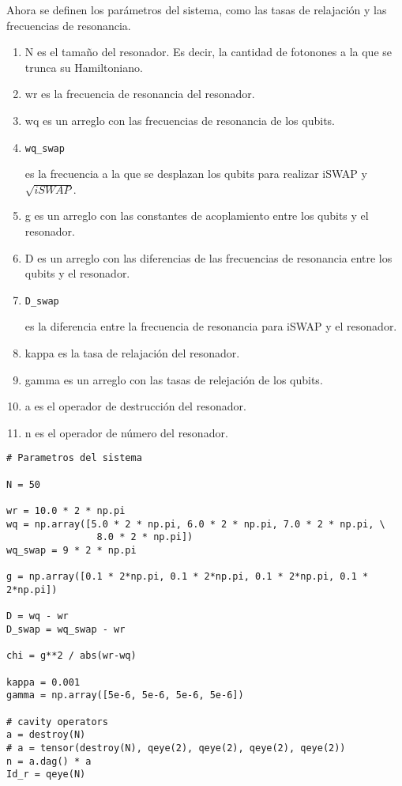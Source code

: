 Ahora se definen los parámetros del sistema, como las tasas de relajación y las frecuencias de resonancia.

\begin{enumerate}
    \item N es el tamaño del resonador. Es decir, la cantidad de fotonones a la que se trunca su Hamiltoniano.
    \item wr es la frecuencia de resonancia del resonador.
    \item wq es un arreglo con las frecuencias de resonancia de los qubits.
    \item \begin{verbatim}wq_swap\end{verbatim} es la frecuencia a la que se desplazan los qubits para realizar iSWAP y $\sqrt{iSWAP}$.
    \item g es un arreglo con las constantes de acoplamiento entre los qubits y el resonador.
    \item D es un arreglo con las diferencias de las frecuencias de resonancia entre los qubits y el resonador.
    \item \begin{verbatim}D_swap\end{verbatim} es la diferencia entre la frecuencia de resonancia para iSWAP y el resonador.
    \item kappa es la tasa de relajación del resonador.
    \item gamma es un arreglo con las tasas de relejación de los qubits.
    \item a es el operador de destrucción del resonador.
    \item n es el operador de número del resonador.
\end{enumerate}

\begin{verbatim}
# Parametros del sistema

N = 50

wr = 10.0 * 2 * np.pi
wq = np.array([5.0 * 2 * np.pi, 6.0 * 2 * np.pi, 7.0 * 2 * np.pi, \
                8.0 * 2 * np.pi])
wq_swap = 9 * 2 * np.pi

g = np.array([0.1 * 2*np.pi, 0.1 * 2*np.pi, 0.1 * 2*np.pi, 0.1 * 2*np.pi])

D = wq - wr
D_swap = wq_swap - wr

chi = g**2 / abs(wr-wq)

kappa = 0.001
gamma = np.array([5e-6, 5e-6, 5e-6, 5e-6])

# cavity operators
a = destroy(N)
# a = tensor(destroy(N), qeye(2), qeye(2), qeye(2), qeye(2))
n = a.dag() * a
Id_r = qeye(N)
\end{verbatim}

